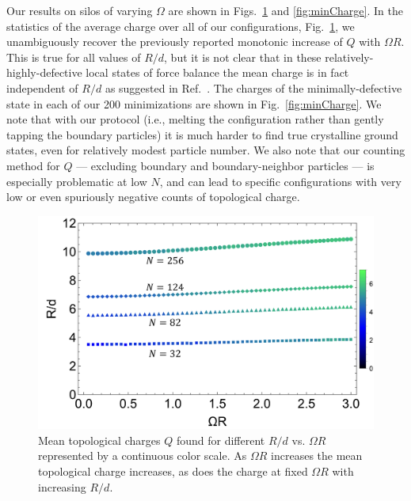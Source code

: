 \documentclass[preprint,12pt]{elsarticle}
\begin{document}
Our results on silos of varying $\Omega$ are shown in Figs.~\ref{fig:meanCharge} and \ref{fig:minCharge}. In the statistics of the average charge over all of our configurations, Fig.~\ref{fig:meanCharge}, we unambiguously recover the previously reported monotonic increase of $Q$ with $\Omega R$. This is true for all values of $R/d$, but it is not clear that in these relatively-highly-defective local states of force balance the mean charge is in fact independent of $R/d$ as suggested in Ref.~\cite{bruss2012non}. The charges of the minimally-defective state in each of our 200 minimizations are shown in Fig.~\ref{fig:minCharge}. We note that with our protocol (i.e., melting the configuration rather than gently tapping the boundary particles) it is much harder to find true crystalline ground states, even for relatively modest particle number. We also note that our counting method for $Q$ --- excluding boundary and boundary-neighbor particles --- is especially problematic at low $N$, and can lead to specific configurations with very low or even spuriously negative counts of topological charge.

\begin{figure}
    \centering
    \includegraphics[width=1.0\linewidth]{meancounts_v4.pdf}
    \caption{Mean topological charges $Q$ found for different $R/d$ vs. 
$\Omega R$ represented by a continuous color scale. As $\Omega R$ increases the mean topological charge increases, as does the charge at fixed $\Omega R$ with increasing $R/d$.}
    \label{fig:meanCharge} 
\end{figure}
\end{document}
